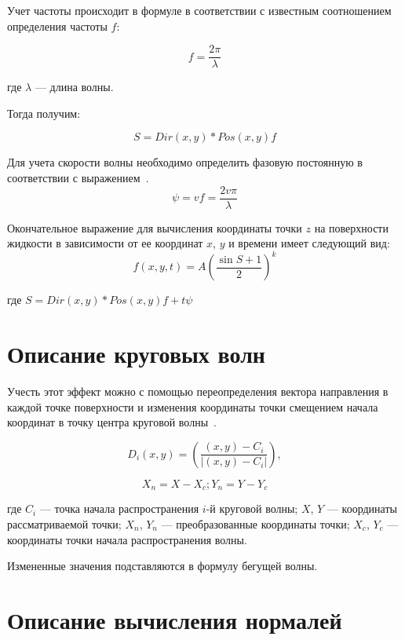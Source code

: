 Учет частоты происходит в формуле в соответствии с известным соотношением определения частоты $f$:

\begin{equation}
    f = \dfrac{2\pi}{\lambda}
\end{equation}

где $\lambda$ — длина волны.

Тогда получим:

\begin{equation}
    S = Dir(x,y)*Pos(x,y)f
\end{equation}

Для учета скорости волны необходимо определить фазовую постоянную в соответствии с выражением~\cite{WAVE}.
\begin{equation}
    \psi = vf = \dfrac{2v\pi}{\lambda}
\end{equation}

Окончательное выражение для вычисления координаты точки $z$ на поверхности жидкости 
в зависимости от ее координат $x$, $y$ и времени имеет следующий вид:
\begin{equation}
    f(x,y,t) = A\left(\dfrac{\sin{S} + 1}{2}\right)^k
\end{equation}

где $S = Dir(x, y)*Pos(x, y)f + t\psi$

\section{Описание круговых волн}
Учесть этот эффект можно с помощью переопределения вектора направления в каждой точке поверхности 
и изменения координаты точки смещением начала координат в точку центра круговой волны~\cite{WAVE}.

\begin{equation}
        D_i(x,y) = \left(\dfrac{(x, y) - C_i}{|(x, y) - C_i|}\right),
\end{equation}

$$X_n = X - X_c; Y_n = Y - Y_c$$

где $C_i$ — точка начала распространения $i$-й круговой волны; 
$X$, $Y$ — координаты рассматриваемой точки; 
$X_n$, $Y_n$ — преобразованные координаты точки; 
$X_c$, $Y_c$ — координаты точки начала распространения волны.


Измененные значения подставляются в формулу бегущей волны.

\section{Описание вычисления нормалей}

